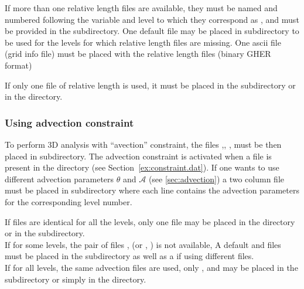 If more than one relative length files are available, they must be  named and numbered following the variable and level to which they correspond as , and must be provided in the  subdirectory. One default file  may be placed in   subdirectory to be used for the levels for which relative length files are missing. One  ascii file (grid info file) must be placed with the relative length files (binary GHER format)

If only one  file of relative length is used, it must be placed in  the  subdirectory or in the  directory.

\begin{center}
\end{center}


\subsubsection{Using advection constraint}
\label{advconstuse}


To perform 3D analysis with  ``avection''  constraint, the files ,\linebreak {}, ,  must be then placed in  subdirectory. The advection constraint is activated when a  file is present in the  directory (see Section~\ref{ex:constraint.dat}). If one wants to use different advection parameters $\theta$ and $\mathcal{A}$ (see \ref{sec:advection}) a two column  file must be placed in  subdirectory where each line contains the advection parameters for the corresponding level number.

If  files are identical for all the levels, only one file  may be placed in the  directory or in the  subdirectory.\\
 If for some levels, the pair of files ,  (or , ) is not available, A default  and  files must be placed in the  subdirectory as well as a  if using different  files.\\
 If for all levels, the same advection files are used, only  ,  and  may be placed in the  subdirectory or simply in the  directory.



